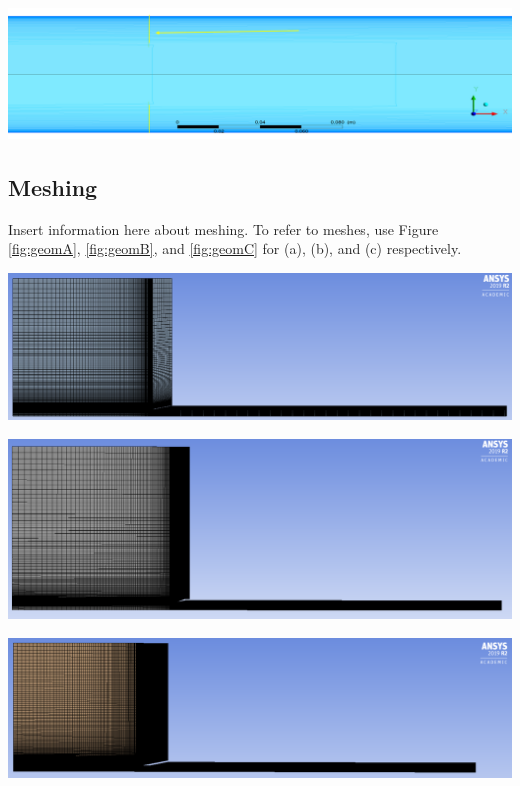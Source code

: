 \documentclass[12pt]{article} %
\begin{document}
\begin{center}
    \includegraphics[width = \linewidth]{BoundaryLength.PNG}
    \label{fig:boundarylength}
\end{center}

\subsection{Meshing}\label{section:mesh}
Insert information here about meshing. To refer to meshes, use Figure \ref{fig:geomA}, \ref{fig:geomB}, and \ref{fig:geomC} for (a), (b), and (c) respectively.

\begin{center}
    \includegraphics[width = \linewidth]{NozzleA_Mesh.PNG}
    \label{fig:geomA}
\end{center}

\begin{center}
    \includegraphics[width = \linewidth]{NozzleB_Mesh.PNG}
    \label{fig:geomB}
\end{center}

\begin{center}
    \includegraphics[width = \linewidth]{NozzleC_Mesh.PNG}
    \label{fig:geomC}
\end{center}
\end{document}
